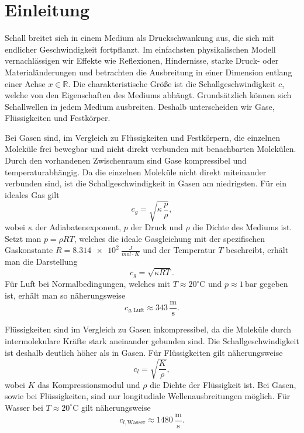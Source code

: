 %
%
%
%
\section{Einleitung\label{schall:section:teil0}}

Schall breitet sich in einem Medium als Druckschwankung aus, die sich
mit endlicher Geschwindigkeit fortpflanzt.
Im einfachsten physikalischen Modell vernachlässigen wir Effekte wie
Reflexionen, Hindernisse, starke Druck- oder Materialänderungen und
betrachten die Ausbreitung in einer Dimension entlang einer Achse
$x \in \mathbb{R}$.
Die charakteristische Größe ist die Schallgeschwindigkeit $c$, welche
von den Eigenschaften des Mediums abhängt.
Grundsätzlich können sich Schallwellen in jedem Medium ausbreiten.
Deshalb unterscheiden wir Gase, Flüssigkeiten und Festkörper.

Bei Gasen sind, im Vergleich zu Flüssigkeiten und Festkörpern, die
einzelnen Moleküle frei bewegbar und nicht direkt verbunden mit
benachbarten Molekülen.
Durch den vorhandenen Zwischenraum sind Gase kompressibel und
temperaturabhängig.
Da die einzelnen Moleküle nicht direkt miteinander verbunden sind,
ist die Schallgeschwindigkeit in Gasen am niedrigsten.
Für ein ideales Gas gilt
\begin{equation}
    c_{g} = \sqrt{\kappa \, \frac{p}{\rho}},
\end{equation}
wobei $\kappa$ der Adiabatenexponent, $p$ der Druck und $\rho$ die
Dichte des Mediums ist.
Setzt man $p = \rho R T$, welches die ideale Gasgleichung mit der
spezifischen Gaskonstante $R = \SI{8.314e2}{\frac{J}{mol \cdot K}}$
und der Temperatur $T$ beschreibt, erhält man die Darstellung
\begin{equation}
    c_{g} = \sqrt{\kappa R T}.
\end{equation}
Für Luft bei Normalbedingungen, welches mit
$T \approx 20^\circ \mathrm{C}$ und $p \approx 1\,\mathrm{bar}$
gegeben ist, erhält man so näherungsweise
\begin{equation}
    c_{g,\text{Luft}} \approx 343 \,\frac{\mathrm{m}}{\mathrm{s}}.
\end{equation}

Flüssigkeiten sind im Vergleich zu Gasen inkompressibel, da die
Moleküle durch intermolekulare Kräfte stark aneinander gebunden sind.
Die Schallgeschwindigkeit ist deshalb deutlich höher als in Gasen.
Für Flüssigkeiten gilt näherungsweise
\begin{equation}
    c_{l} = \sqrt{\frac{K}{\rho}},
\end{equation}
wobei $K$ das Kompressionsmodul und $\rho$ die Dichte der Flüssigkeit ist.
Bei Gasen, sowie bei Flüssigkeiten, sind nur longitudiale
Wellenausbreitungen möglich.
Für Wasser bei $T \approx 20^\circ \mathrm{C}$ gilt näherungsweise
\begin{equation}
    c_{l,\text{Wasser}} \approx 1480 \,\frac{\mathrm{m}}{\mathrm{s}}.
\end{equation}


